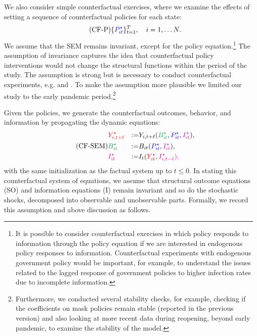 \documentclass[11pt,reqno,letter]{amsart}
\theoremstyle{definition}
\def\bcolor{\color{ForestGreen}}
\def\pcolor{\color{blue}}
\def\icolor{\color{magenta}}
\def\ycolor{\color{red}}
\begin{document}
We  also consider simple counterfactual exercises, where we examine the effects of setting
a sequence of counterfactual policies for each state:
\begin{equation} \label{p-cf}\tag{CF-P}
\{{\pcolor P^\star_{it}} \}_{t=1}^T, \quad i=1, \ldots N.
\end{equation}
We assume that the SEM remains invariant, except for the policy equation.\footnote{It is possible to consider counterfactual exercises in which policy  responds to information through the policy equation if we are interested in endogenous policy responses to information. Counterfactual experiments with endogenous government policy would be important, for example, to understand the issues related to the lagged response of government policies to higher infection rates due to incomplete information. } 
The assumption  of invariance captures the idea that counterfactual policy interventions would not change the structural functions within the period of the study.  The assumption is strong but is necessary to conduct
counterfactual experiments, e.g. \cite{sims1972} and \cite{strotz1960recursive}. To make the assumption more plausible we limited our study to the early pandemic period.\footnote{Furthermore, we conducted several stability checks, for example, checking if the coefficients on mask policies remain stable (reported in the previous version) and also looking at more recent data during reopening, beyond early pandemic, to examine the stability of the model.} 

Given the policies, we generate the counterfactual
outcomes, behavior, and information by propagating the dynamic equations:
\begin{equation} \label{eqn:CF-SEM} \tag{CF-SEM}
  \begin{aligned}
& {\ycolor Y^\star_{i,t+\ell}}  & := & Y_{i,t+\ell} ( {\bcolor B^\star_{it} } , {\pcolor P^\star_{it}}, {\icolor I^\star_{it}}), \\
& {\bcolor B^\star_{it} } & := &   B_{it}({\pcolor P^\star_{it} } ,{\icolor I^\star_{it}}), \\
& {\icolor I^\star_{it} }& := &  I_t ( {\ycolor Y^\star_{it}}, \icolor I^\star_{i,t-\ell}),  \end{aligned}
\end{equation}
with the same initialization as the factual system up to $t \leq 0$. In stating this counterfactual system of equations, we assume that structural outcome equations (SO) and information equations (I) remain invariant and so do the stochastic shocks, decomposed
into observable and unobservable parts. Formally, we record this assumption and above discussion as follows.
\end{document}
